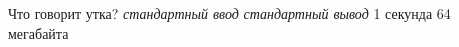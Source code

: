 \begin{problem}%
{Что говорит утка?}%
{\textsl{стандартный ввод}}%
{\textsl{стандартный вывод}}%
{1 секунда}%
{64 мегабайта}{}

\end{problem}
